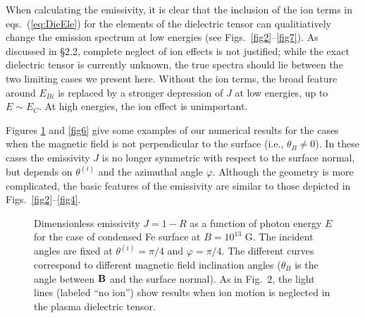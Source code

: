 \documentclass{emulateapj}
\newcommand{\bB}{{\bf B}}
\begin{document}

When calculating the emissivity, it is clear that the inclusion of the ion terms 
in eqs.~(\ref{eq:DieEle}) for the elements of the dielectric tensor can qualitiatively 
change the emission spectrum at low energies (see Figs.~\ref{fig2}--\ref{fig7}).  
As discussed in \S 2.2, complete neglect of ion effects is not justified; while 
the exact dielectric tensor is currently unknown, the true spectra should lie 
between the two limiting cases we present here.
Without the ion terms, the broad feature around $E_{Bi}$ is replaced by a stronger 
depression of $J$ at low energies, up to $E\sim E_C$.  At high energies, the ion 
effect is unimportant.

Figures \ref{fig5} and \ref{fig6} 
give some examples of our numerical results for the cases when the magnetic field 
is not perpendicular to the surface (i.e., $\theta_B \ne 0$).  In these cases the emissivity $J$ is 
no longer symmetric with respect to the surface normal, but depends on $\theta^{(i)}$ and the azimuthal 
angle $\varphi$.  Although the geometry is more complicated, the basic features of the emissivity are 
similar to those depicted in Figs.\ \ref{fig2}--\ref{fig4}.

\begin{figure}
\caption{Dimensionless emissivity $J=1-R$ 
as a function of photon energy $E$ 
for the case of condensed Fe surface at $B=10^{13}$ G.  The incident angles are 
fixed at $\theta^{(i)} 
=\pi/4$ and $\varphi = \pi/4$.  The different curves correspond to 
different magnetic field inclination angles 
($\theta_B$ is the angle between $\bB$ and the surface normal).  As in Fig.~2, the 
light lines (labeled ``no ion'') show results when ion motion is neglected in the 
plasma dielectric 
tensor.}
\label{fig5}
\end{figure}
\end{document}
